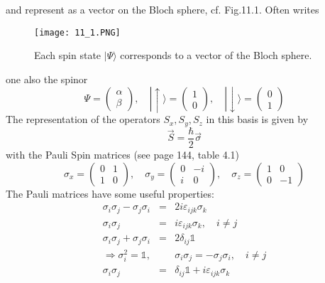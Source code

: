 and represent as a vector on the Bloch sphere, cf. Fig.11.1. Often writes
\begin{figure}[ht]
    \begin{minipage}{0.5\textwidth}
        \centering
        \texttt{[image: 11\_1.PNG]}
    \end{minipage}
    \begin{minipage}{0.5\textwidth}
        \caption{Each spin state $| \Psi\rangle$ corresponds to a vector of the Bloch sphere.}
    \end{minipage}
\end{figure}
one also the spinor
\begin{equation}
\Psi=\left(\begin{array}{c}{\alpha} \\ {\beta}\end{array}\right), \quad|\uparrow\rangle=\left(\begin{array}{c}{1} \\ {0}\end{array}\right), \quad|\downarrow\rangle=\left(\begin{array}{c}{0} \\ {1}\end{array}\right)
\end{equation}
The representation of the operators $S_x,S_y,S_z$ in this basis is given by
\begin{equation}
    \vec{S}=\frac{\hbar}{2} \vec{\sigma}
    \end{equation}
with the Pauli Spin matrices (see page 144, table 4.1)
\begin{equation}
\sigma_{x}=\left(\begin{array}{cc}{0} & {1} \\ {1} & {0}\end{array}\right), \quad \sigma_{y}=\left(\begin{array}{cc}{0} & {-i} \\ {i} & {0}\end{array}\right), \quad \sigma_{z}=\left(\begin{array}{cc}{1} & {0} \\ {0} & {-1}\end{array}\right)
\end{equation}
The Pauli matrices have some useful properties:
\begin{eqnarray}
\sigma_{i} \sigma_{j}-\sigma_{j} \sigma_{i} &=&2 i \varepsilon_{i j k} \sigma_{k} \\ \sigma_{i} \sigma_{j} &=&i \varepsilon_{i j k} \sigma_{k}, \quad i \neq j \\ \sigma_{i} \sigma_{j}+\sigma_{j} \sigma_{i} &=&2 \delta_{i j} \mathbb{1} \\ \Rightarrow \sigma_{i}^{2}=\mathbb{1}, & &\sigma_{i} \sigma_{j}=-\sigma_{j} \sigma_{i}, \quad i \neq j \nonumber\\ \sigma_{i} \sigma_{j} &=&\delta_{i j}\mathbb{1}+i \varepsilon_{i j k} \sigma_{k} \end{eqnarray}
